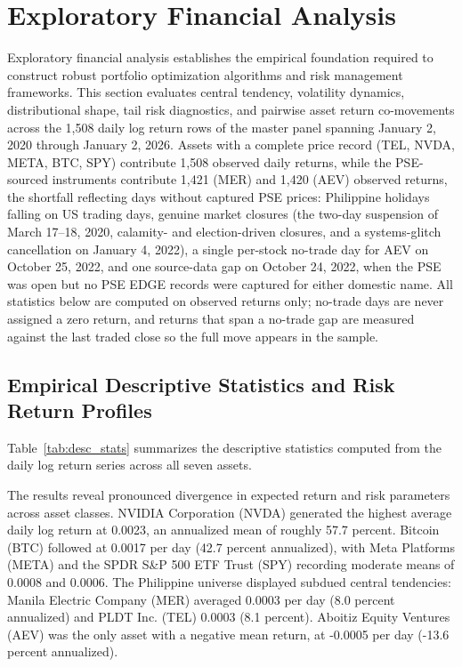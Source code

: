 \section{Exploratory Financial Analysis}

Exploratory financial analysis establishes the empirical foundation required to construct robust portfolio optimization algorithms and risk management frameworks. This section evaluates central tendency, volatility dynamics, distributional shape, tail risk diagnostics, and pairwise asset return co-movements across the 1,508 daily log return rows of the master panel spanning January 2, 2020 through January 2, 2026. Assets with a complete price record (TEL, NVDA, META, BTC, SPY) contribute 1,508 observed daily returns, while the PSE-sourced instruments contribute 1,421 (MER) and 1,420 (AEV) observed returns, the shortfall reflecting days without captured PSE prices: Philippine holidays falling on US trading days, genuine market closures (the two-day suspension of March 17--18, 2020, calamity- and election-driven closures, and a systems-glitch cancellation on January 4, 2022), a single per-stock no-trade day for AEV on October 25, 2022, and one source-data gap on October 24, 2022, when the PSE was open but no PSE EDGE records were captured for either domestic name. All statistics below are computed on observed returns only; no-trade days are never assigned a zero return, and returns that span a no-trade gap are measured against the last traded close so the full move appears in the sample.

\subsection{Empirical Descriptive Statistics and Risk Return Profiles}

Table~\ref{tab:desc_stats} summarizes the descriptive statistics computed from the daily log return series across all seven assets.



The results reveal pronounced divergence in expected return and risk parameters across asset classes. NVIDIA Corporation (NVDA) generated the highest average daily log return at 0.0023, an annualized mean of roughly 57.7 percent. Bitcoin (BTC) followed at 0.0017 per day (42.7 percent annualized), with Meta Platforms (META) and the SPDR S\&P 500 ETF Trust (SPY) recording moderate means of 0.0008 and 0.0006. The Philippine universe displayed subdued central tendencies: Manila Electric Company (MER) averaged 0.0003 per day (8.0 percent annualized) and PLDT Inc. (TEL) 0.0003 (8.1 percent). Aboitiz Equity Ventures (AEV) was the only asset with a negative mean return, at -0.0005 per day (-13.6 percent annualized).

